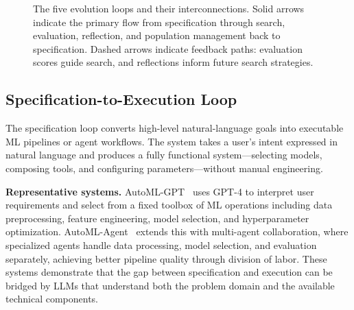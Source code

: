 \documentclass[11pt,a4paper]{article}
\begin{document}
\begin{figure}[t]
\centering
{}
\caption{The five evolution loops and their interconnections. Solid arrows indicate the primary flow from specification through search, evaluation, reflection, and population management back to specification. Dashed arrows indicate feedback paths: evaluation scores guide search, and reflections inform future search strategies.}
\label{fig:five-loops}
\end{figure}

\subsection{Specification-to-Execution Loop}

The specification loop converts high-level natural-language goals into executable ML pipelines or agent workflows. The system takes a user's intent expressed in natural language and produces a fully functional system---selecting models, composing tools, and configuring parameters---without manual engineering.

\textbf{Representative systems.} AutoML-GPT~\citep{automlgpt2023} uses GPT-4 to interpret user requirements and select from a fixed toolbox of ML operations including data preprocessing, feature engineering, model selection, and hyperparameter optimization. AutoML-Agent~\citep{automlagent2024} extends this with multi-agent collaboration, where specialized agents handle data processing, model selection, and evaluation separately, achieving better pipeline quality through division of labor. These systems demonstrate that the gap between specification and execution can be bridged by LLMs that understand both the problem domain and the available technical components.
\end{document}
